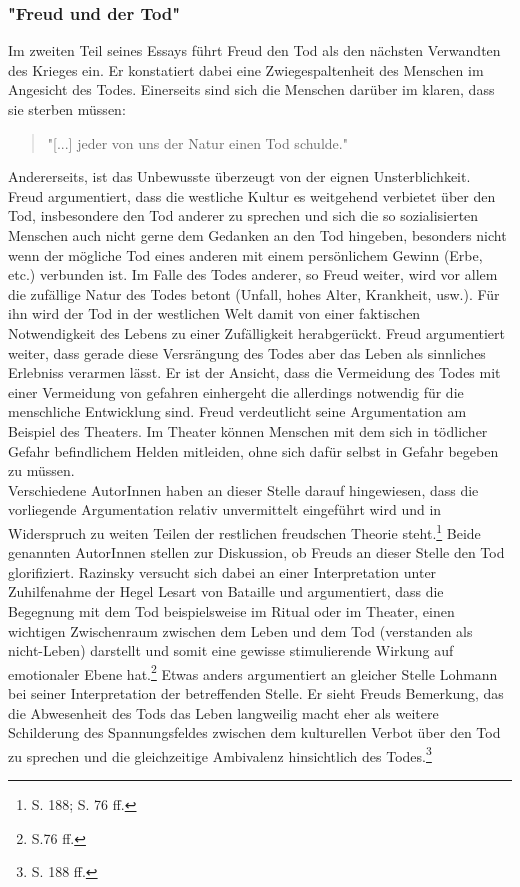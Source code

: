 \documentclass[11pt,a4paper,oneside,numbers=noenddot,bibliography=totocnumbered,DIV=13]{scrartcl}
\begin{document}
\subsubsection{"Freud und der Tod"}
  Im zweiten Teil seines Essays führt Freud den Tod als den nächsten Verwandten des Krieges ein. Er  konstatiert dabei eine Zwiegespaltenheit des Menschen im Angesicht des Todes. Einerseits sind sich die Menschen darüber im klaren, dass sie sterben müssen:
  \begin{quote}
  "[...] jeder von uns der Natur einen Tod schulde."
  \end{quote}
Andererseits, ist das Unbewusste überzeugt von der eignen Unsterblichkeit.\\
 Freud argumentiert, dass die westliche Kultur es weitgehend verbietet über den Tod, insbesondere den Tod anderer zu sprechen und sich die so sozialisierten Menschen auch nicht gerne dem Gedanken an den Tod hingeben, besonders nicht wenn der mögliche Tod eines anderen mit einem persönlichem Gewinn (Erbe, etc.) verbunden ist. Im Falle des Todes anderer, so Freud weiter, wird vor allem die zufällige Natur des Todes betont (Unfall, hohes Alter, Krankheit, usw.). Für ihn wird der Tod in der westlichen Welt damit von einer faktischen Notwendigkeit des Lebens zu einer Zufälligkeit herabgerückt.
Freud argumentiert weiter, dass gerade diese Versrängung des Todes aber das Leben als sinnliches Erlebniss verarmen lässt. Er ist der Ansicht, dass die Vermeidung des Todes mit einer Vermeidung von gefahren einhergeht die allerdings notwendig für die menschliche Entwicklung sind. Freud verdeutlicht seine Argumentation am Beispiel des Theaters. Im Theater können Menschen mit dem sich in tödlicher Gefahr befindlichem Helden mitleiden, ohne sich dafür selbst in Gefahr begeben zu müssen. \\
Verschiedene AutorInnen haben an dieser Stelle darauf hingewiesen, dass die vorliegende Argumentation relativ unvermittelt eingeführt wird und in Widerspruch zu weiten Teilen der restlichen freudschen Theorie steht.\footnote{\cite{lohmann_freud-handbuch:_2013} S. 188; \cite{liran_razinsky_how_2009} S. 76 ff.} Beide genannten AutorInnen stellen zur Diskussion, ob Freuds an dieser Stelle den Tod glorifiziert. Razinsky versucht sich dabei an einer Interpretation unter Zuhilfenahme der Hegel Lesart von Bataille und argumentiert, dass die Begegnung mit dem Tod beispielsweise im Ritual oder im Theater, einen wichtigen Zwischenraum zwischen dem Leben und dem Tod (verstanden als nicht-Leben) darstellt und somit eine gewisse stimulierende Wirkung auf emotionaler Ebene hat.\footnote{\cite{liran_razinsky_how_2009} S.76 ff.} Etwas anders argumentiert an gleicher Stelle Lohmann bei seiner Interpretation der betreffenden Stelle. Er sieht Freuds Bemerkung, das die Abwesenheit des Tods das Leben langweilig macht eher als weitere Schilderung des Spannungsfeldes zwischen dem kulturellen Verbot über den Tod zu sprechen und die gleichzeitige Ambivalenz hinsichtlich des Todes.\footnote{\cite{lohmann_freud-handbuch:_2013} S. 188 ff.}
\end{document}
